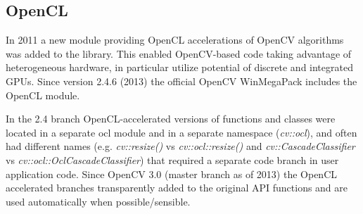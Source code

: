 \documentclass[9pt,twocolumn,twoside]{../../styles/osajnl}
\begin{document}
\subsection{OpenCL}
In 2011 a new module providing OpenCL accelerations of OpenCV algorithms was added to the library. This enabled OpenCV-based code taking advantage of heterogeneous hardware, in particular utilize potential of discrete and integrated GPUs. Since version 2.4.6 (2013) the official OpenCV WinMegaPack includes the OpenCL module.

In the 2.4 branch OpenCL-accelerated versions of functions and classes were located in a separate ocl module and in a separate namespace (\textit{cv::ocl}), and often had different names (e.g. \textit{cv::resize()} vs \textit{cv::ocl::resize()} and \textit{cv::CascadeClassifier} vs \textit{cv::ocl::OclCascadeClassifier}) that required a separate code branch in user application code. Since OpenCV 3.0 (master branch as of 2013) the OpenCL accelerated branches transparently added to the original API functions and are used automatically when possible/sensible.
\end{document}
